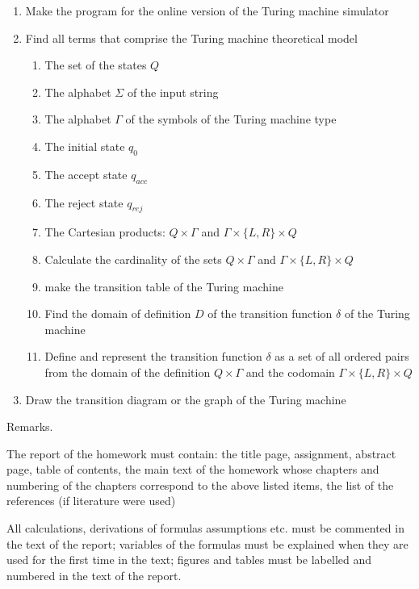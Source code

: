 \documentclass[12pt, a4paper, bibliography=totocnumbered]{report}
\begin{document}
\begin{multicols}{2}
	\begin{enumerate}[label=(\Roman*)]
		\item Make the program for the online version of the Turing machine simulator
		\item Find all terms that comprise the Turing machine theoretical model
		\begin{enumerate}[label=(\arabic*)]
			\item The set of the states $ Q $
			\item The alphabet $\Sigma $ of the input string
			\item The alphabet $\Gamma$ of the symbols of the Turing machine type
			\item The initial state $q_0$
			\item The accept state $q_{acc}$
			\item The reject state $q_{rej}$
			\item The Cartesian products: $Q \times \Gamma$ and $ \Gamma \times \{L, R\} \times Q $
			\item Calculate the cardinality of the sets $ Q \times \Gamma$ and $ \Gamma \times \{L, R\} \times Q $
			\item make the transition table of the Turing machine
			\item Find the domain of definition $ D $ of the transition function $ \delta $ of the Turing machine
			\item Define and represent the transition function $ \delta $ as a set of all ordered pairs from the domain of the definition $Q \times \Gamma$ and the codomain $ \Gamma \times \{L, R\} \times Q$
		\end{enumerate}
		\item Draw the transition diagram or the graph of the Turing machine
	\end{enumerate}
\end{multicols}

Remarks.
\par
The report of the homework must contain: the title page, assignment, abstract page, table of contents, the main text of the homework whose chapters and numbering of the chapters correspond to the above listed items, the list of the references (if literature were used)
\par
All calculations, derivations of formulas assumptions etc. must be commented in the text of the report; variables of the formulas must be explained when they are used for the first time in the text; figures and tables must be labelled and numbered in the text of the report.
\end{document}
